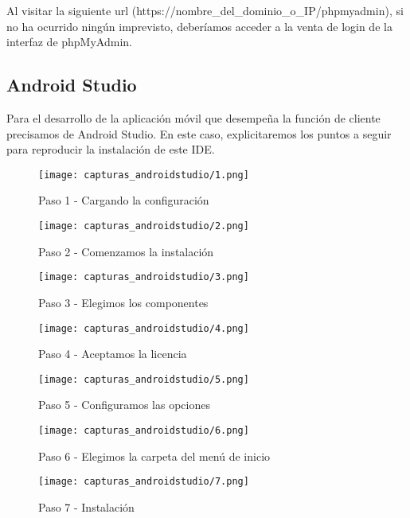 \documentclass[11pt,spanish,
		listoftables,listoffigures]
		{tfgplantilla}
\begin{document}
Al visitar la siguiente url (https://nombre\_del\_dominio\_o\_IP/phpmyadmin), si no ha ocurrido ningún imprevisto, deberíamos acceder a la venta de login de la interfaz de phpMyAdmin.

\subsection {Android Studio}

Para el desarrollo de la aplicación móvil que desempeña la función de cliente precisamos de Android Studio. En este caso, explicitaremos los puntos a seguir para reproducir la instalación de este IDE.

\begin{figure}[H]
\centering
\texttt{[image: capturas\_androidstudio/1.png]}
\caption{Paso 1 - Cargando la configuración}
\end{figure}

\begin{figure}[H]
\centering
\texttt{[image: capturas\_androidstudio/2.png]}
\caption{Paso 2 - Comenzamos la instalación}
\end{figure}

\begin{figure}[H]
\centering
\texttt{[image: capturas\_androidstudio/3.png]}
\caption{Paso 3 - Elegimos los componentes}
\end{figure}

\begin{figure}[H]
\centering
\texttt{[image: capturas\_androidstudio/4.png]}
\caption{Paso 4 - Aceptamos la licencia}
\end{figure}

\begin{figure}[H]
\centering
\texttt{[image: capturas\_androidstudio/5.png]}
\caption{Paso 5 - Configuramos las opciones}
\end{figure}

\begin{figure}[H]
\centering
\texttt{[image: capturas\_androidstudio/6.png]}
\caption{Paso 6 - Elegimos la carpeta del menú de inicio}
\end{figure}

\begin{figure}[H]
\centering
\texttt{[image: capturas\_androidstudio/7.png]}
\caption{Paso 7 - Instalación}
\end{figure}
\end{document}
